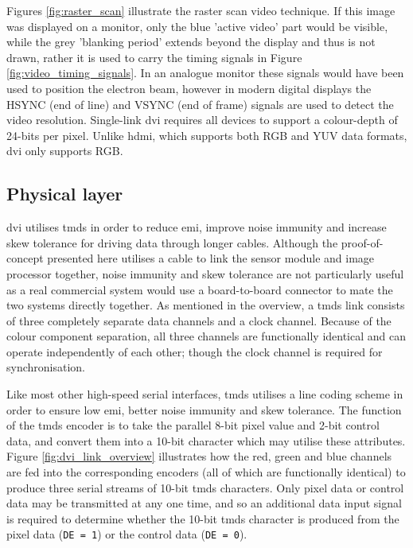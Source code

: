 Figures \ref{fig:raster_scan} illustrate the raster scan video technique. If this image was displayed on a monitor, only the blue 'active video' part would be visible, while the grey 'blanking period' extends beyond the display and thus is not drawn, rather it is used to carry the timing signals in Figure \ref{fig:video_timing_signals}. In an analogue monitor these signals would have been used to position the electron beam, however in modern digital displays the HSYNC (end of line) and VSYNC (end of frame) signals are used to detect the video resolution. Single-link \gls{dvi} requires all devices to support a colour-depth of 24-bits per pixel. Unlike \gls{hdmi}, which supports both RGB and YUV data formats, \gls{dvi} only supports RGB.

\subsection{Physical layer}

\gls{dvi} utilises \gls{tmds} in order to reduce \gls{emi}, improve noise immunity and increase skew tolerance for driving data through longer cables. Although the proof-of-concept presented here utilises a cable to link the sensor module and image processor together, noise immunity and skew tolerance are not particularly useful as a real commercial system would use a board-to-board connector to mate the two systems directly together. As mentioned in the overview, a \gls{tmds} link consists of three completely separate data channels and a clock channel. Because of the colour component separation, all three channels are functionally identical and can operate independently of each other; though the clock channel is required for synchronisation.

Like most other high-speed serial interfaces, \gls{tmds} utilises a line coding scheme in order to ensure low \gls{emi}, better noise immunity and skew tolerance. The function of the \gls{tmds} encoder is to take the parallel 8-bit pixel value and 2-bit control data, and convert them into a 10-bit character which may utilise these attributes. Figure \ref{fig:dvi_link_overview} illustrates how the red, green and blue channels are fed into the corresponding encoders (all of which are functionally identical) to produce three serial streams of 10-bit \gls{tmds} characters. Only pixel data or control data may be transmitted at any one time, and so an additional data input signal is required to determine whether the 10-bit \gls{tmds} character is produced from the pixel data (\texttt{DE = 1}) or the control data (\texttt{DE = 0}). 


